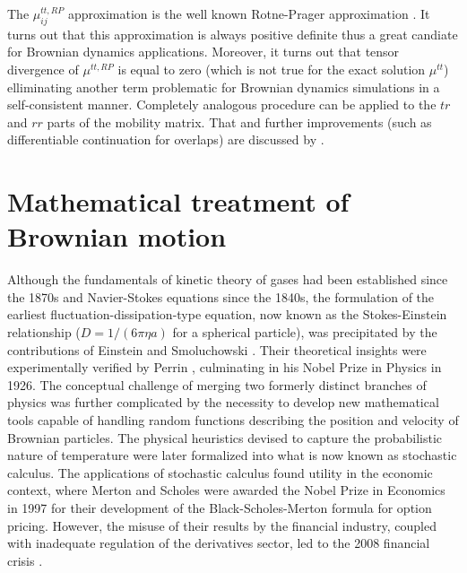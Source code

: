 \documentclass{doctoral}
\newcommand{\mm}[1]{\bm{\mathsf{#1}}} %
\begin{document}
The $\mm{\mu}_{ij}^{tt,RP}$ approximation is the well known Rotne-Prager approximation \cite{Nagele_2013,Dhont_2008,Kim_2013}.
It turns out that this approximation is always positive definite thus a great candiate for Brownian dynamics applications.
Moreover, it turns out that tensor divergence of $\mm{\mu}^{tt,RP}$ is equal to zero (which is not true for the exact solution $\mm{\mu}^{tt}$) elliminating another term problematic for Brownian dynamics simulations in a self-consistent manner\cite{Ermak_1978}.
Completely analogous procedure can be applied to the $tr$ and $rr$ parts of the mobility matrix.
That and further improvements (such as differentiable continuation for overlaps) are discussed by \textcite{Zuk_2018}.

\section{Mathematical treatment of Brownian motion}
\label{sec:SDE}

Although the fundamentals of kinetic theory of gases had been established since the 1870s and Navier-Stokes equations since the 1840s, the formulation of the earliest fluctuation-dissipation-type equation, now known as the Stokes-Einstein relationship ($D = 1 / (6 \pi \eta a)$ for a spherical particle), was precipitated by the contributions of Einstein \cite{Einstein_1905} and Smoluchowski \cite{Smoluchowski_1906}.
Their theoretical insights were experimentally verified by Perrin \cite{Perrin_1909}, culminating in his Nobel Prize in Physics in 1926.
The conceptual challenge of merging two formerly distinct branches of physics was further complicated by the necessity to develop new mathematical tools capable of handling random functions describing the position and velocity of Brownian particles.
The physical heuristics devised to capture the probabilistic nature of temperature were later formalized into what is now known as stochastic calculus.
The applications of stochastic calculus found utility in the economic context, where Merton and Scholes were awarded the Nobel Prize in Economics in 1997 for their development of the Black-Scholes-Merton formula for option pricing.
However, the misuse of their results by the financial industry, coupled with inadequate regulation of the derivatives sector, led to the 2008 financial crisis \cite{fcic_report}.
\end{document}
